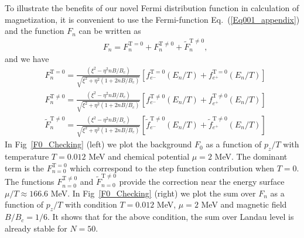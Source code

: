 \documentclass[sn-mathphys,Numbered]{sn-jnl}
\begin{document}
To illustrate the benefits of our novel Fermi distribution function in calculation of magnetization, it is convenient to use the Fermi-function Eq.~(\ref{Eq001_appendix}) and the function $F_n$ can be written as
\begin{align}
&F_n=F_n^{\mathrm{T=0}}+F_n^{\mathrm{T\neq0}}+\widetilde F_n^{\mathrm{T\neq0}},
\end{align}
and we have
\begin{align}
&F_n^{\mathrm{T=0}}=\frac{(\xi^2-\eta^2nB/B_c)}{\sqrt{\xi^2+\eta^2\left(1+2nB/B_c\right)}}\left[f^{\mathrm{T=0}}_{e^-}(E_n/T)+f^{\mathrm{T=0}}_{e^+}(E_n/T)\right]\\
&F_n^{\mathrm{T\neq0}}=\frac{(\xi^2-\eta^2nB/B_c)}{\sqrt{\xi^2+\eta^2\left(1+2nB/B_c\right)}}\left[f^{\mathrm{T\neq0}}_{e^-}(E_n/T)+f^{\mathrm{T\neq0}}_{e^+}(E_n/T)\right]\\
&\widetilde F_n^{\mathrm{T\neq0}}=\frac{(\xi^2-\eta^2nB/B_c)}{\sqrt{\xi^2+\eta^2\left(1+2nB/B_c\right)}}\left[\tilde f^{\mathrm{T\ne0}}_{e^-}(E_n/T)+\tilde f^{\mathrm{T\neq0}}_{e^+}(E_n/T)\right]
\end{align}
In Fig~\ref{F0_Checking} (left) we plot the background  $F_0$ as a function of $p_z/T$ with temperature $T=0.012$ MeV and chemical potential $\mu=2$ MeV. The dominant term is the $F_{n=0}^{\mathrm{T=0}}$ which correspond to the step function contribution when $T=0$. The functions $F_{n=0}^{\mathrm{T\neq0}}$ and $\widetilde F_{n=0}^{\mathrm{T\neq0}}$ provide the correction near the energy surface $\mu/T\approx166.6$ MeV. In Fig~\ref{F0_Checking} (right) we plot the sum over $F_n$ as a function of $p_z/T$ with condition $T=0.012$ MeV, $\mu=2$ MeV and magnetic field $B/B_c=1/6$. It shows that for the above condition, the sum over Landau level is already stable for $N=50$.
\end{document}
